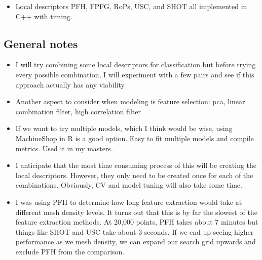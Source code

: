 \documentclass[11pt]{article}
\theoremstyle{definition}
\begin{document}
\begin{itemize}
    \item Local descriptors PFH, FPFG, RoPs, USC, and SHOT all implemented in C++ with timing.
\end{itemize}

\subsection{General notes}

\begin{itemize}
    \item I will try combining some local descriptors for classification but before trying every possible combination, I will experiment with a few pairs and see if this approach actually has any viability
    \item Another aspect to consider when modeling is feature selection: pca, linear combination filter, high correlation filter
    \item If we want to try multiple models, which I think would be wise, using MachineShop in R is a good option. Easy to fit multiple models and compile metrics. Used it in my masters.
    \item I anticipate that the most time consuming process of this will be creating the local descriptors. However, they only need to be created once for each of the combinations. Obviously, CV and model tuning will also take some time. 
    \item I was using PFH to determine how long feature extraction would take at different mesh density levels. It turns out that this is by far the slowest of the feature extraction methods. At 20,000 points, PFH takes about 7 minutes but things like SHOT and USC take about 3 seconds. If we end up seeing higher performance as we mesh density, we can expand our search grid upwards and exclude PFH from the comparison.

\end{itemize}
\end{document}

